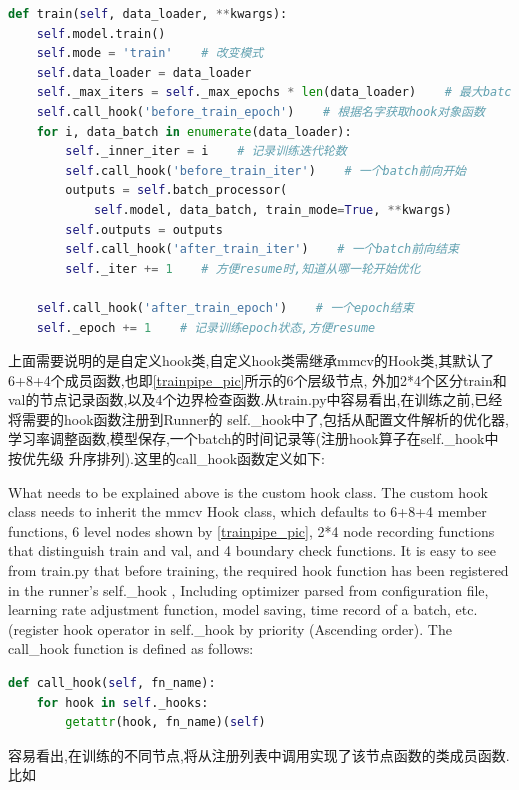 \documentclass[UTF8]{ctexart}
\begin{document}
\lstset{style=mystyle}
\begin{lstlisting}[language=Python]
 def train(self, data_loader, **kwargs):
	self.model.train()
	self.mode = 'train'    # 改变模式
	self.data_loader = data_loader
	self._max_iters = self._max_epochs * len(data_loader)    # 最大batch循环次数
	self.call_hook('before_train_epoch')    # 根据名字获取hook对象函数
	for i, data_batch in enumerate(data_loader):
		self._inner_iter = i    # 记录训练迭代轮数
		self.call_hook('before_train_iter')    # 一个batch前向开始
		outputs = self.batch_processor(
			self.model, data_batch, train_mode=True, **kwargs)
		self.outputs = outputs
		self.call_hook('after_train_iter')    # 一个batch前向结束
		self._iter += 1    # 方便resume时,知道从哪一轮开始优化

	self.call_hook('after_train_epoch')    # 一个epoch结束
	self._epoch += 1    # 记录训练epoch状态,方便resume

\end{lstlisting}

上面需要说明的是自定义hook类,自定义hook类需继承mmcv的Hook类,其默认了6+8+4个成员函数,也即\ref{trainpipe_pic}所示的6个层级节点,
外加2*4个区分train和val的节点记录函数,以及4个边界检查函数.从train.py中容易看出,在训练之前,已经将需要的hook函数注册到Runner的
self.\_hook中了,包括从配置文件解析的优化器,学习率调整函数,模型保存,一个batch的时间记录等(注册hook算子在self.\_hook中按优先级
升序排列).这里的call\_hook函数定义如下:

What needs to be explained above is the custom hook class. The custom hook class needs to inherit the mmcv 
Hook class, which defaults to 6+8+4 member functions, 6 level nodes shown by \ref{trainpipe_pic},
2*4 node recording functions that distinguish train and val, and 4 boundary check functions.
It is easy to see from train.py that before training, the required hook function has been registered in 
the runner's self.\_hook , Including optimizer parsed from configuration file, learning rate adjustment 
function, model saving, time record of a batch, etc. (register hook operator in self.\_hook by priority
(Ascending order). The call\_hook function is defined as follows:

\lstset{style=mystyle}
\begin{lstlisting}[language=Python]
def call_hook(self, fn_name):
	for hook in self._hooks:
		getattr(hook, fn_name)(self)
\end{lstlisting}

容易看出,在训练的不同节点,将从注册列表中调用实现了该节点函数的类成员函数.比如
\end{document}
